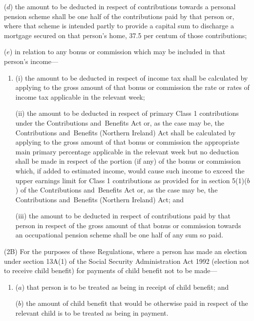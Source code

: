 \documentclass[12pt,a4paper]{article}
\begin{document}
\begin{enumerate}
($d$) the amount to be deducted in respect of contributions towards a personal pension scheme shall be one half of the contributions paid by that person or, where that scheme is intended partly to provide a capital sum to discharge a mortgage secured on that person’s home, 37$.$5 per centum of those contributions;

($e$) in relation to any bonus or commission which may be included in that person’s income—
\begin{enumerate}\item[]
(i) the amount to be deducted in respect of income tax shall be calculated by applying to the gross amount of that bonus or commission the rate or rates of income tax applicable in the relevant week;

(ii) the amount to be deducted in respect of primary Class 1 contributions under the Contributions and~Benefits Act 
or, as the case may be, the Contributions and~Benefits (Northern Ireland) Act  %
shall be calculated by applying to the gross amount of that bonus or commission the appropriate main primary percentage applicable in the relevant week
but no deduction shall be made in respect of the portion (if any) of the bonus or commission which, if added to estimated income, would cause such income to exceed the upper earnings limit for Class 1 contributions as provided for in section 5(1)($b$) of the Contributions and~Benefits Act %
or, as the case may be, the Contributions and~Benefits (Northern Ireland) Act;  %
and

(iii) the amount to be deducted in respect of contributions paid by that person in respect of the gross amount of that bonus or commission towards an occupational pension scheme shall be one half of any sum so paid.
\end{enumerate}
\end{enumerate}

(2B) For the purposes of these Regulations, where a person has made an election under section 13A(1) of the Social Security Administration Act 1992 (election not to receive child benefit) for payments of child benefit not to be made—
\begin{enumerate}\item[]
($a$) that person is to be treated as being in receipt of child benefit; and

($b$) the amount of child benefit that would be otherwise paid in respect of the relevant child is to be treated as being in payment.
\end{enumerate}
\end{document}

